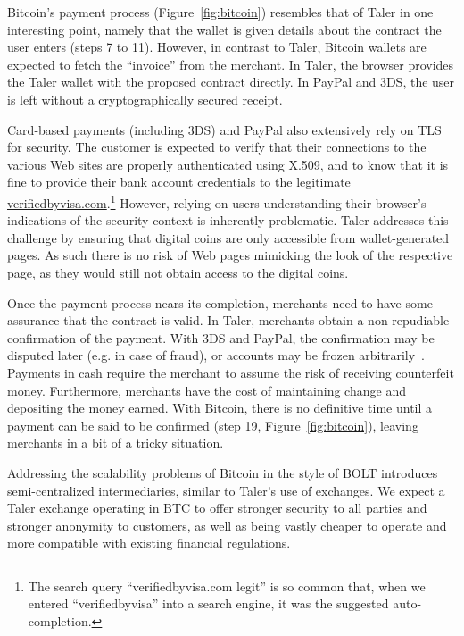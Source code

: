 \documentclass{llncs}
\begin{document}
Bitcoin's payment process (Figure~\ref{fig:bitcoin}) resembles that of
Taler in one interesting point, namely that the wallet is given
details about the contract the user enters (steps 7 to 11).
However, in contrast to Taler, Bitcoin wallets are expected
to fetch the ``invoice'' from the merchant. In Taler, the browser
provides the Taler wallet with the proposed contract directly.  In
PayPal and 3DS, the user is left without a cryptographically secured
receipt.

Card-based payments (including 3DS) and PayPal also extensively rely
on TLS for security.  The customer is expected to verify that their
connections to the various Web sites are properly authenticated using
X.509, and to know that it is fine to provide their bank account
credentials to the legitimate
\url{verifiedbyvisa.com}.\footnote{The search query
``verifiedbyvisa.com legit'' is so common that, when we entered
``verifiedbyvisa'' into a search engine, it was the suggested
auto-completion.}  However, relying on users understanding their
browser's indications of the security context is inherently
problematic.  Taler addresses this challenge by ensuring that digital
coins are only accessible from wallet-generated pages. As such
there is no risk of Web pages mimicking the look of the respective
page, as they would still not obtain access to the digital coins.

Once the payment process nears its completion, merchants need to have
some assurance that the contract is valid.  In Taler, merchants
obtain a non-repudiable confirmation of the payment.  With 3DS and
PayPal, the confirmation may be disputed later (e.g. in case of
fraud), or accounts may be frozen arbitrarily~\cite{diaspora2011}.
Payments in cash require the merchant to assume the risk of receiving
counterfeit money.
Furthermore, merchants have the cost of maintaining change and depositing
the money earned.  With Bitcoin, there is no definitive time until a
payment can be said to be confirmed (step 19, Figure~\ref{fig:bitcoin}),
leaving merchants in a bit of a tricky situation.

Addressing the scalability problems of Bitcoin in the style of BOLT
introduces semi-centralized intermediaries, similar to Taler's use of
exchanges.  We expect a Taler exchange operating in BTC to offer
stronger security to all parties and stronger anonymity to customers,
as well as being vastly cheaper to operate and more compatible with
existing financial regulations.
\end{document}
